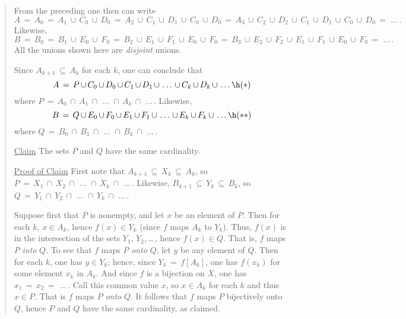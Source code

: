\begin{quotation}
{\V

\noindent From the preceding one then can write
        \begin{displaymath}
        A \,=\, A_{0} \,=\, A_{1}\,{\cup}\,C_{0}\,{\cup}\,D_{0} \,=\, A_{2}\,{\cup}\,C_{1}\,{\cup}\,D_{1}\,{\cup}\,C_{0}\,{\cup}\,D_{0} \,=\, 
A_{3}\,{\cup}\,C_{2}\,{\cup}\,D_{2}\,{\cup}\,C_{1}\,{\cup}\,D_{1}\,{\cup}\,C_{0}\,{\cup}\,D_{0} \,=\, \,{\ldots}\,.
        \end{displaymath}
    Likewise,
        \begin{displaymath}
        B \,=\, B_{0} \,=\, B_{1}\,{\cup}\,E_{0}\,{\cup}\,F_{0} \,=\, B_{2}\,{\cup}\,E_{1}\,{\cup}\,F_{1}\,{\cup}\,E_{0}\,{\cup}\,F_{0} \,=\,
B_{3}\,{\cup}\,E_{2}\,{\cup}\,F_{2}\,{\cup}\,E_{1}\,{\cup}\,F_{1}\,{\cup}\,E_{0}\,{\cup}\,F_{0} \,=\, \,{\ldots}\,.
        \end{displaymath}
    All the unions shown here are {\em disjoint} unions.

        Since $A_{k+1} \,{\subseteq}\, A_{k}$ for each $k$, one can conclude that
        \begin{displaymath}
        A \,=\, P\,{\cup}\, C_{0}\,{\cup}\,D_{0}\,{\cup}\,C_{1}\,{\cup}\,D_{1}\,{\cup}\,\,{\ldots}\,\,{\cup}\,C_{k}\,{\cup}\,D_{k}\,{\cup}\,\,{\ldots}\, \h ({\ast})
        \end{displaymath}
    where $P \,=\, A_{0}\,{\cap}\,A_{1}\,{\cap}\,\, {\ldots}\,\,{\cap}\,A_{k}\,{\cap}\,\,{\ldots}\,$.
    Likewise,
        \begin{displaymath}
        B \,=\, Q\,{\cup}\, E_{0}\,{\cup}\,F_{0}\,{\cup}\,E_{1}\,{\cup}\,F_{1}\,{\cup}\,\,{\ldots}\,\,{\cup}\,E_{k}\,{\cup}\,F_{k}\,{\cup}\,\,{\ldots}\, \h ({\ast}{\ast})
        \end{displaymath}
    where $Q \,=\, B_{0}\,{\cap}\,B_{1}\,{\cap}\,\, {\ldots}\,\,{\cap}\,B_{k}\,{\cap}\,\,{\ldots}\,$.

        \underline{Claim} The sets $P$ and $Q$ have the same cardinality.

        \underline{Proof of Claim} First note that $A_{k+1} \,{\subseteq}\, X_{k} \,{\subseteq}\, A_{k}$, so $P \,=\,X_{1}\,{\cap}\,X_{2}\,{\cap}\,\,{\ldots}\,\,{\cap}\,X_{k}\,{\cap}\,\,{\ldots}\,$.
    Likewise, $B_{k+1} \,{\subseteq}\, Y_{k} \,{\subseteq}\, B_{k}$, so $Q \,=\, Y_{1}\,{\cap}\,Y_{2}\,{\cap}\,\,{\ldots}\,\,{\cap}\,Y_{k}\,{\cap}\,\,{\ldots}\,$.

        Suppose first that $P$ is nonempty, and let $x$ be an element of $P$. Then for each $k$, $x{\in}A_{k}$, hence $f(x){\in}Y_{k}$ (since $f$ maps $A_{k}$ to $Y_{k}$).
    Thus, $f(x)$ is in the intersection of the sets $Y_{1}$, $Y_{2}$,\,{\ldots}\,, hence $f(x){\in}Q$. That is, $f$ maps $P$ {\em into} $Q$.
    To see that $f$ maps $P$ {\em onto} $Q$, let $y$ be any element of $Q$. Then for each $k$, one has $y{\in}Y_{k}$; hence, since $Y_{k} \,=\, f[A_{k}]$,
    one has $f(x_{k})$ for some element $x_{k}$ in $A_{k}$. And since $f$ is a bijection on $X$, one has $x_{1} \,=\, x_{2} \,=\, \,{\ldots}\,$.
    Call this common value $x$, so $x{\in}A_{k}$ for each $k$ and thus $x{\in}P$.
    That is $f$ maps $P$ {\em onto} $Q$.  It follows that $f$ maps $P$ bijectively onto $Q$, hence $P$ and $Q$ have the same cardinality, as claimed.

}
\end{quotation}
